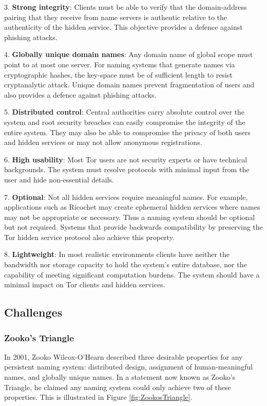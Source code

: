 \documentclass[USenglish,oneside,twocolumn]{article}
\begin{document}
3. \textbf{Strong integrity}: Clients must be able to verify that the domain-address pairing that they receive from name servers is authentic relative to the authenticity of the hidden service. This objective provides a defence against phishing attacks.

4. \textbf{Globally unique domain names}: Any domain name of global scope must point to at most one server. For naming systems that generate names via cryptographic hashes, the key-space must be of sufficient length to resist cryptanalytic attack. Unique domain names prevent fragmentation of users and also provides a defence against phishing attacks.

5. \textbf{Distributed control}: Central authorities carry absolute control over the system and root security breaches can easily compromise the integrity of the entire system. They may also be able to compromise the privacy of both users and hidden services or may not allow anonymous registrations.

6. \textbf{High usability}: Most Tor users are not security experts or have technical backgrounds. The system must resolve protocols with minimal input from the user and hide non-essential details.

7. \textbf{Optional}: Not all hidden services require meaningful names. For example, applications such as Ricochet \cite{RicochetGithub} may create ephemeral hidden services where names may not be appropriate or necessary. Thus a naming system should be optional but not required. Systems that provide backwards compatibility by preserving the Tor hidden service protocol also achieve this property.

8. \textbf{Lightweight}: In most realistic environments clients have neither the bandwidth nor storage capacity to hold the system's entire database, nor the capability of meeting significant computation burdens. The system should have a minimal impact on Tor clients and hidden services.

\subsection{Challenges}

\subsubsection{Zooko's Triangle}
\label{sec:ZookosTriangle}

In 2001, Zooko Wilcox-O'Hearn described three desirable properties for any persistent naming system: distributed design, assignment of human-meaningful names, and globally unique names. In a statement now known as Zooko's Triangle, \cite{ferdous2009security, stiegler2005petname} he claimed any naming system could only achieve two of these properties. This is illustrated in Figure \ref{fig:ZookosTriangle}.
\end{document}
